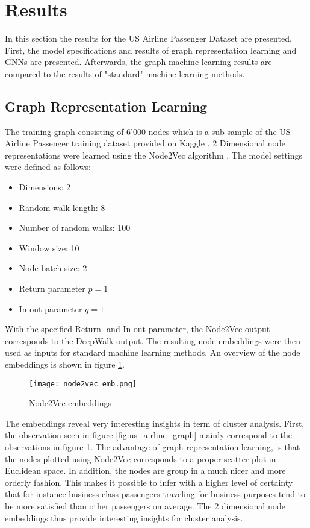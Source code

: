 
  \section{Results}
  
  In this section the results for the US Airline Passenger Dataset are
  presented. First, the model specifications and results of graph
  representation learning and GNNs are presented. Afterwards, the graph machine
  learning results are compared to the results of "standard" machine
  learning methods.

  \subsection{Graph Representation Learning}

  The training graph consisting of 6'000 nodes which is a sub-sample of the
  US Airline Passenger training dataset provided on Kaggle \citep{KAGGLE2015}.
  2 Dimensional node representations were learned using the Node2Vec algorithm
  \citep{grover2016node2vec}. The model settings were defined as follows:

  \begin{itemize}[itemsep=1mm]
    \item Dimensions: 2
    \item Random walk length: 8
    \item Number of random walks: 100
    \item Window size: 10
    \item Node batch size: 2
    \item Return parameter $p=1$
    \item In-out parameter $q=1$
  \end{itemize}

  \noindent With the specified Return- and In-out parameter, the Node2Vec
  output corresponds to the DeepWalk output. The resulting node embeddings were
  then used as inputs for standard machine learning methods. An overview of the
  node embeddings is shown in figure \ref{fig:node2vec}. 

  \begin{figure}[h]
		\centering
		\texttt{[image: node2vec\_emb.png]}
		\caption{Node2Vec embeddings}
        \label{fig:node2vec}
  \end{figure}

  \noindent The embeddings reveal very interesting insights in term of cluster
  analysis. First, the observation seen in figure \ref{fig:us_airline_graph}
  mainly correspond to the observations in figure \ref{fig:node2vec}. The
  advantage of graph representation learning, is that the nodes plotted using
  Node2Vec corresponds to a proper scatter plot in Euclidean space. In
  addition, the nodes are group in a much nicer and more orderly fashion. This
  makes it possible to infer with a higher level of certainty that for instance
  business class passengers traveling for business purposes tend to be more
  satisfied than other passengers on average. The 2 dimensional node embeddings
  thus provide interesting insights for cluster analysis. \\

